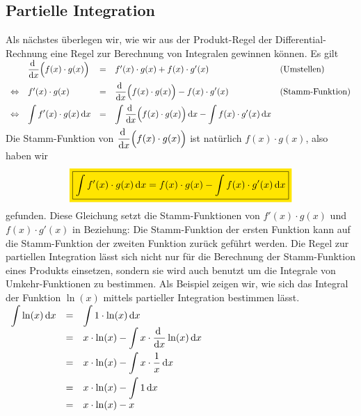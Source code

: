 \subsection{Partielle Integration}
Als n\"achstes \"uberlegen wir, wie wir aus der Produkt-Regel der Differential-Rechnung
eine Regel zur Berechnung von Integralen gewinnen k\"onnen.  Es gilt
\\[0.2cm]
$
\begin{array}[t]{llcll}
                & \displaystyle\frac{\textrm{d}\;}{\textrm{d}x} \Bigl(f(x)\cdot g(x)\Bigr)  & = & f'(x)\cdot  g(x) + f(x) \cdot  g'(x) &\mbox{(Umstellen)} \\[0.3cm]
\Leftrightarrow & f'(x) \cdot  g(x) & = & \displaystyle\frac{\textrm{d}\;}{\textrm{d}x} \Bigl(f(x)\cdot g(x)\Bigr) - f(x) \cdot  g'(x) &\mbox{(Stamm-Funktion)} \\[0.3cm]
\Leftrightarrow & \displaystyle \int f'(x)\cdot  g(x)\,\textrm{d} x & = & \displaystyle\int\displaystyle\frac{\textrm{d}\;}{\textrm{d}x} \Bigl(f(x)\cdot g(x)\Bigr)\,\textrm{d} x - \int f(x) \cdot  g'(x)\,\textrm{d} x \\[0.3cm]
\end{array}
$
\\[0.2cm]
Die Stamm-Funktion von $\displaystyle\frac{\textrm{d}\;}{\textrm{d}x}\Bigl( f(x)\cdot g(x) \Bigr)$ ist nat\"urlich $f(x)\cdot g(x)$, also haben wir
\begin{equation}
  \label{eq:partInt0}
 \colorbox{orange}{\framebox{$\ds\int f'(x)\cdot  g(x)\,\dr x =  \ds f(x)\cdot g(x) - \int f(x) \cdot  g'(x)\,\dr x$}}
\end{equation}
gefunden. Diese Gleichung setzt die Stamm-Funktionen von $f'(x)\cdot  g(x)$
und $f(x) \cdot  g'(x)$ in Beziehung: Die Stamm-Funktion der ersten Funktion kann auf die
Stamm-Funktion der zweiten Funktion zur\"uck gef\"uhrt werden.
Die Regel zur partiellen Integration l\"asst sich nicht nur f\"ur die Berechnung der
Stamm-Funktion eines Produkts einsetzen, sondern sie wird auch benutzt um die Integrale von
Umkehr-Funktionen zu bestimmen.  Als Beispiel zeigen wir, wie sich das Integral der 
Funktion $\ln(x)$ mittels partieller Integration bestimmen l\"asst.
\\[0.3cm]
\hspace*{1.3cm}
$
\begin{array}[t]{lcl}
 \displaystyle\int\ln(x)\,\textrm{d} x & = &  \displaystyle\int1\cdot \ln(x)\,\textrm{d} x \\[0.2cm]
                 & = &  x\cdot \ln(x) - \displaystyle\int x\cdot \displaystyle\frac{\textrm{d}\;}{\textrm{d}x} \ln(x)\,\textrm{d} x \\[0.3cm]
                 & = &  x\cdot \ln(x) - \displaystyle\int x\cdot \frac{1}{x}\,\textrm{d} x \\[0.3cm]
                 & = &  x\cdot \ln(x) - \displaystyle\int 1\,\textrm{d} x \\[0.2cm]
                 & = &  x\cdot \ln(x) - x \\[0.2cm]
\end{array}
$

